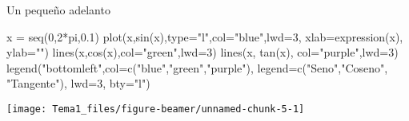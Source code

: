 \documentclass[
  ignorenonframetext,
]{beamer}
\newenvironment{Shaded}{\begin{snugshade}}{\end{snugshade}}
\newcommand{\AttributeTok}[1]{\textcolor[rgb]{0.77,0.63,0.00}{#1}}
\newcommand{\DecValTok}[1]{\textcolor[rgb]{0.00,0.00,0.81}{#1}}
\newcommand{\FloatTok}[1]{\textcolor[rgb]{0.00,0.00,0.81}{#1}}
\newcommand{\FunctionTok}[1]{\textcolor[rgb]{0.00,0.00,0.00}{#1}}
\newcommand{\NormalTok}[1]{#1}
\newcommand{\OtherTok}[1]{\textcolor[rgb]{0.56,0.35,0.01}{#1}}
\newcommand{\SpecialCharTok}[1]{\textcolor[rgb]{0.00,0.00,0.00}{#1}}
\newcommand{\StringTok}[1]{\textcolor[rgb]{0.31,0.60,0.02}{#1}}
\begin{document}
\begin{frame}[fragile]{Un pequeño adelanto}
\protect\hypertarget{un-pequeuxf1o-adelanto}{}
\begin{Shaded}
\begin{Highlighting}[]
\NormalTok{x }\OtherTok{=} \FunctionTok{seq}\NormalTok{(}\DecValTok{0}\NormalTok{,}\DecValTok{2}\SpecialCharTok{*}\NormalTok{pi,}\FloatTok{0.1}\NormalTok{)}
\FunctionTok{plot}\NormalTok{(x,}\FunctionTok{sin}\NormalTok{(x),}\AttributeTok{type=}\StringTok{"l"}\NormalTok{,}\AttributeTok{col=}\StringTok{"blue"}\NormalTok{,}\AttributeTok{lwd=}\DecValTok{3}\NormalTok{, }\AttributeTok{xlab=}\FunctionTok{expression}\NormalTok{(x), }\AttributeTok{ylab=}\StringTok{""}\NormalTok{)}
\FunctionTok{lines}\NormalTok{(x,}\FunctionTok{cos}\NormalTok{(x),}\AttributeTok{col=}\StringTok{"green"}\NormalTok{,}\AttributeTok{lwd=}\DecValTok{3}\NormalTok{)}
\FunctionTok{lines}\NormalTok{(x, }\FunctionTok{tan}\NormalTok{(x), }\AttributeTok{col=}\StringTok{"purple"}\NormalTok{,}\AttributeTok{lwd=}\DecValTok{3}\NormalTok{)}
\FunctionTok{legend}\NormalTok{(}\StringTok{"bottomleft"}\NormalTok{,}\AttributeTok{col=}\FunctionTok{c}\NormalTok{(}\StringTok{"blue"}\NormalTok{,}\StringTok{"green"}\NormalTok{,}\StringTok{"purple"}\NormalTok{),}
     \AttributeTok{legend=}\FunctionTok{c}\NormalTok{(}\StringTok{"Seno"}\NormalTok{,}\StringTok{"Coseno"}\NormalTok{, }\StringTok{"Tangente"}\NormalTok{), }\AttributeTok{lwd=}\DecValTok{3}\NormalTok{, }\AttributeTok{bty=}\StringTok{"l"}\NormalTok{)}
\end{Highlighting}
\end{Shaded}

\begin{center}\texttt{[image: Tema1\_files/figure-beamer/unnamed-chunk-5-1]} \end{center}
\end{frame}
\end{document}
